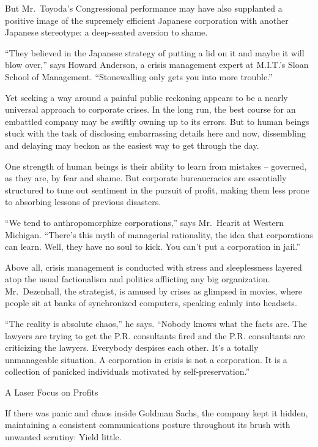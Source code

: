 ﻿\documentclass[12pt]{article}
\begin{document}
But Mr.~Toyoda's Congressional performance may have also supplanted a positive image of the
supremely efficient Japanese corporation with another Japanese stereotype: a deep-seated aversion to
shame.

``They believed in the Japanese strategy of putting a lid on it and maybe it will blow over,'' says
Howard Anderson, a crisis management expert at M.I.T.'s Sloan School of Management. ``Stonewalling
only gets you into more trouble.''

Yet seeking a way around a painful public reckoning appears to be a nearly universal approach to
corporate crises. In the long run, the best course for an embattled company may be swiftly owning up
to its errors. But to human beings stuck with the task of disclosing embarrassing details here and
now, dissembling and delaying may beckon as the easiest way to get through the day.

One strength of human beings is their ability to learn from mistakes -- governed, as they are, by
fear and shame. But corporate bureaucracies are essentially structured to tune out sentiment in the
pursuit of profit, making them less prone to absorbing lessons of previous disasters.

``We tend to anthropomorphize corporations,'' says Mr.~Hearit at Western Michigan. ``There's this
myth of managerial rationality, the idea that corporations can learn. Well, they have no soul to
kick. You can't put a corporation in jail.''

Above all, crisis management is conducted with stress and sleeplessness layered atop the usual
factionalism and politics afflicting any big organization. Mr.~Dezenhall, the strategist, is amused
by crises as glimpsed in movies, where people sit at banks of synchronized computers, speaking
calmly into headsets.

``The reality is absolute chaos,'' he says. ``Nobody knows what the facts are. The lawyers are
trying to get the P.R. consultants fired and the P.R. consultants are criticizing the lawyers.
Everybody despises each other. It's a totally unmanageable situation. A corporation in crisis is not
a corporation. It is a collection of panicked individuals motivated by self-preservation.''

A Laser Focus on Profits

If there was panic and chaos inside Goldman Sachs, the company kept it hidden, maintaining a
consistent communications posture throughout its brush with unwanted scrutiny: Yield little.
\end{document}
